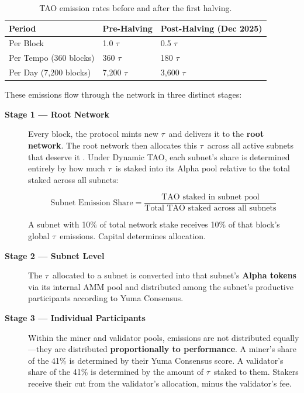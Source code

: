 \documentclass[12pt, a4paper, oneside]{report}
\newcommand{\TAO}{$\tau$}            %
\theoremstyle{definition}
\begin{document}
\begin{table}[H]
\centering
\renewcommand{\arraystretch}{1.5}
\begin{tabular}{lll}
\toprule
\textbf{Period} & \textbf{Pre-Halving} & \textbf{Post-Halving (Dec 2025)} \\
\midrule
Per Block  & 1.0 \TAO   & 0.5 \TAO   \\
Per Tempo (360 blocks) & 360 \TAO  & 180 \TAO   \\
Per Day (7,200 blocks) & 7,200 \TAO & 3,600 \TAO \\
\bottomrule
\end{tabular}
\caption{TAO emission rates before and after the first halving.}
\label{tab:emissions_rate}
\end{table}

\noindent These emissions flow through the network in three distinct stages:

\begin{description}
  \item[\textbf{Stage 1 — Root Network}] Every block, the protocol mints 
  new \TAO\ and delivers it to the \textbf{root network}. The root network 
  then allocates this \TAO\ across all active subnets that deserve it . Under Dynamic TAO, 
  each subnet's share is determined entirely by how much \TAO\ is staked 
  into its Alpha pool relative to the total staked across all subnets:

  \[
    \text{Subnet Emission Share} = \frac{\text{TAO staked in subnet pool}}
    {\text{Total TAO staked across all subnets}}
  \]

  A subnet with 10\% of total network stake receives 10\% of that block's 
  global \TAO\ emissions. Capital determines allocation. 

  \item[\textbf{Stage 2 — Subnet Level}] The \TAO\ allocated to a subnet 
  is converted into that subnet's \textbf{Alpha tokens} via its internal 
  AMM pool and distributed among the subnet's productive participants 
  according to Yuma Consensus.



  \item[\textbf{Stage 3 — Individual Participants}] Within the miner and 
  validator pools, emissions are not distributed equally—they are distributed 
  \textbf{proportionally to performance}. A miner's share of the 41\% is 
  determined by their Yuma Consensus score. A validator's share of the 41\% 
  is determined by the amount of \TAO\ staked to them. Stakers receive their 
  cut from the validator's allocation, minus the validator's fee.
\end{description}
\end{document}
